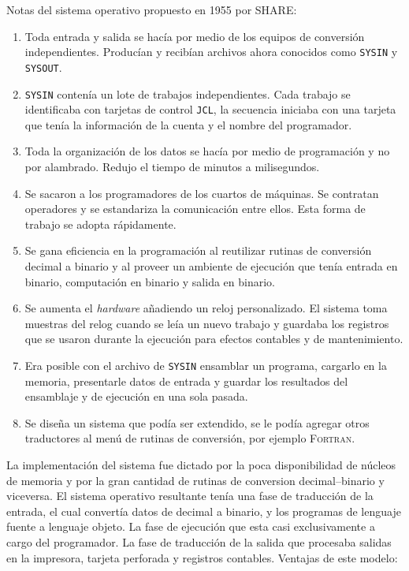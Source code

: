 Notas del sistema operativo propuesto en 1955 por \textsc{SHARE}:
\begin{enumerate}
    \item Toda entrada y salida se hacía por medio de los equipos de conversión independientes. Producían y recibían archivos ahora conocidos como \texttt{SYSIN} y \texttt{SYSOUT}.
    \item \texttt{SYSIN} contenía un lote de trabajos independientes. Cada trabajo se identificaba con tarjetas de control \texttt{JCL}, la secuencia iniciaba con una tarjeta que tenía la información de la cuenta y el nombre del programador.
    \item Toda la organización de los datos se hacía por medio de programación y no por alambrado. Redujo el tiempo de minutos a milisegundos.
    \item Se sacaron a los programadores de los cuartos de máquinas. Se contratan operadores y se estandariza la comunicación entre ellos. Esta forma de trabajo se adopta rápidamente.
    \item Se gana eficiencia en la programación al reutilizar rutinas de conversión decimal a binario y al proveer un ambiente de ejecución que tenía entrada en binario, computación en binario y salida en binario.
    \item Se aumenta el \textit{hardware} añadiendo un reloj personalizado. El sistema toma muestras del relog cuando se leía un nuevo trabajo y guardaba los registros que se usaron durante la ejecución para efectos contables y de mantenimiento.
    \item Era posible con el archivo de \texttt{SYSIN} ensamblar un programa, cargarlo en la memoria, presentarle datos de entrada y guardar los resultados del ensamblaje y de ejecución en una sola pasada.
    \item Se diseña un sistema que podía ser extendido, se le podía agregar otros traductores al menú de rutinas de conversión, por ejemplo \textsc{Fortran}.
    
\end{enumerate}

\label{sec:impl}
La implementación del sistema fue dictado por la poca disponibilidad de núcleos de memoria y por la gran cantidad de rutinas de conversion decimal--binario y viceversa. El sistema operativo resultante tenía una fase de traducción de la entrada, el cual convertía datos de decimal a binario, y los programas de lenguaje fuente a lenguaje objeto. La fase de ejecución que esta casi exclusivamente a cargo del programador. La fase de traducción de la salida que procesaba salidas en la impresora, tarjeta perforada y registros contables. Ventajas de este modelo:

